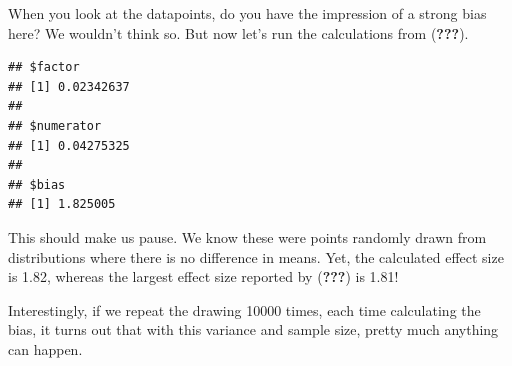 \documentclass[10pt,dvipsnames,enabledeprecatedfontcommands]{scrartcl}
\newenvironment{Shaded}{\begin{snugshade}}{\end{snugshade}}
\newcommand{\KeywordTok}[1]{\textcolor[rgb]{0.13,0.29,0.53}{\textbf{#1}}}
\newcommand{\DataTypeTok}[1]{\textcolor[rgb]{0.13,0.29,0.53}{#1}}
\newcommand{\StringTok}[1]{\textcolor[rgb]{0.31,0.60,0.02}{#1}}
\newcommand{\ControlFlowTok}[1]{\textcolor[rgb]{0.13,0.29,0.53}{\textbf{#1}}}
\newcommand{\OperatorTok}[1]{\textcolor[rgb]{0.81,0.36,0.00}{\textbf{#1}}}
\newcommand{\NormalTok}[1]{#1}
\begin{document}
\noindent When you look at the datapoints, do you have the impression of
a strong bias here? We wouldn't think so. But now let's run the
calculations from ({\textbf{???}}).

\vspace{1mm} \footnotesize

\begin{Shaded}
\end{Shaded}

\begin{verbatim}
## $factor
## [1] 0.02342637
## 
## $numerator
## [1] 0.04275325
## 
## $bias
## [1] 1.825005
\end{verbatim}

\normalsize

\noindent This should make us pause. We know these were points randomly
drawn from distributions where there is no difference in means. Yet, the
calculated effect size is 1.82, whereas the largest effect size reported
by ({\textbf{???}}) is 1.81!

Interestingly, if we repeat the drawing 10000 times, each time
calculating the bias, it turns out that with this variance and sample
size, pretty much anything can happen.

\vspace{1mm} \footnotesize
\end{document}
